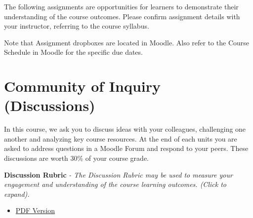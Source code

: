 \documentclass[
]{book}
\providecommand{\tightlist}{%
  \setlength{\itemsep}{0pt}\setlength{\parskip}{0pt}}
\begin{document}
The following assignments are opportunities for learners to demonstrate their understanding of the course outcomes. Please confirm assignment details with your instructor, referring to the course syllabus.

Note that Assignment dropboxes are located in Moodle. Also refer to the Course Schedule in Moodle for the specific due dates.

\hypertarget{community-of-inquiry-discussions}{%
\section*{Community of Inquiry (Discussions)}\label{community-of-inquiry-discussions}}

\begin{assessment}
In this course, we ask you to discuss ideas with your colleagues, challenging one another and analyzing key course resources. At the end of each units you are asked to address questions in a Moodle Forum and respond to your peers. These discussions are worth 30\% of your course grade.
\end{assessment}

\textbf{Discussion Rubric} \emph{- The Discussion Rubric may be used to measure your engagement and understanding of the course learning outcomes. (Click to expand).}

\begin{itemize}
\tightlist
\item
  \href{assets/assessment/LDRS664_DiscussionRubric.pdf}{PDF Version}
\end{itemize}
\end{document}
